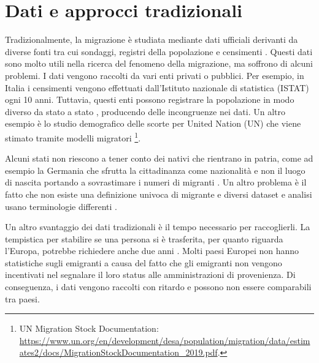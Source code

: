 \section{Dati e approcci tradizionali} 
\label{DatiTradizionali}
Tradizionalmente, la migrazione è studiata mediante dati ufficiali derivanti da diverse fonti tra cui sondaggi, registri della popolazione \cite{sirbu2021human} e censimenti \cite{10.2307/24639395}. Questi dati sono molto utili nella ricerca del fenomeno della migrazione, ma soffrono di alcuni problemi. I dati vengono raccolti da vari enti privati o pubblici. Per esempio,
in Italia i censimenti vengono effettuati dall'Istituto nazionale di statistica (ISTAT) ogni 10 anni.
Tuttavia, questi enti possono registrare la popolazione in modo diverso da stato a stato \cite{poulain2006thesim}, producendo delle incongruenze nei dati. Un altro esempio è
lo studio demografico delle scorte per United Nation (UN) che viene stimato tramite modelli migratori \footnote{UN Migration Stock Documentation: \url{https://www.un.org/en/development/desa/population/migration/data/estimates2/docs/MigrationStockDocumentation_2019.pdf}.}. 

Alcuni stati non riescono a tener conto dei nativi che rientrano in patria, come ad esempio la Germania che sfrutta la cittadinanza come nazionalità e non il luogo di nascita portando a sovrastimare i numeri di migranti \cite{fassmann2009european}. Un altro problema è il fatto che non esiste una definizione univoca di migrante e diversi dataset e analisi usano terminologie differenti \cite{anderson2011counts}.

Un altro svantaggio dei dati tradizionali è il tempo necessario per raccoglierli. La tempistica per stabilire se una persona si è trasferita, per quanto riguarda l'Europa, potrebbe richiedere anche due anni  \cite{deBeer2010}. Molti paesi Europei non hanno statistiche sugli emigranti a causa del fatto che gli emigranti non vengono incentivati nel segnalare il loro status alle amministrazioni di provenienza. Di conseguenza, i dati vengono raccolti con ritardo e possono non essere comparabili tra paesi. 


